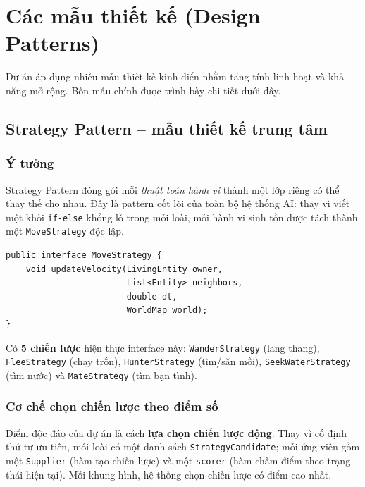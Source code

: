 \documentclass[12pt,a4paper]{report}
\newcommand{\keyword}[1]{\textcolor{primaryblue}{\textbf{#1}}}
\newcommand{\code}[1]{\texttt{\small #1}}
\begin{document}
\chapter{Các mẫu thiết kế (Design Patterns)}

Dự án áp dụng nhiều mẫu thiết kế kinh điển nhằm tăng tính linh hoạt và khả năng mở rộng. Bốn mẫu chính được trình bày chi tiết dưới đây.

\section{Strategy Pattern -- mẫu thiết kế trung tâm}

\subsection{Ý tưởng}

Strategy Pattern đóng gói mỗi \textit{thuật toán hành vi} thành một lớp riêng có thể thay thế cho nhau. Đây là pattern cốt lõi của toàn bộ hệ thống AI: thay vì viết một khối \code{if-else} khổng lồ trong mỗi loài, mỗi hành vi sinh tồn được tách thành một \code{MoveStrategy} độc lập.

\begin{lstlisting}[caption={Interface MoveStrategy -- "hợp đồng" của mọi chiến lược}]
public interface MoveStrategy {
    void updateVelocity(LivingEntity owner,
                        List<Entity> neighbors,
                        double dt,
                        WorldMap world);
}
\end{lstlisting}

Có \keyword{5 chiến lược} hiện thực interface này: \code{WanderStrategy} (lang thang), \code{FleeStrategy} (chạy trốn), \code{HunterStrategy} (tìm/săn mồi), \code{SeekWaterStrategy} (tìm nước) và \code{MateStrategy} (tìm bạn tình).

\subsection{Cơ chế chọn chiến lược theo điểm số}

Điểm độc đáo của dự án là cách \keyword{lựa chọn chiến lược động}. Thay vì cố định thứ tự ưu tiên, mỗi loài có một danh sách \code{StrategyCandidate}; mỗi ứng viên gồm một \code{Supplier} (hàm tạo chiến lược) và một \code{scorer} (hàm chấm điểm theo trạng thái hiện tại). Mỗi khung hình, hệ thống chọn chiến lược có điểm cao nhất.
\end{document}
